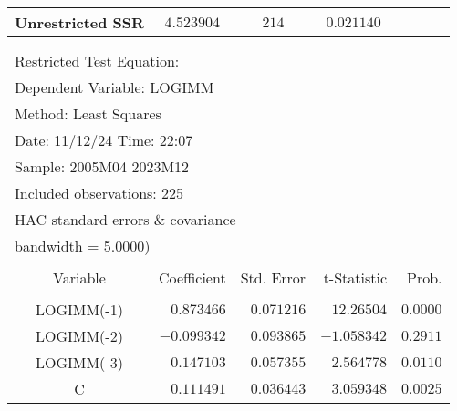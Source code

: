 \begin{tabular}{lrrrr}
\multicolumn{1}{l}{Unrestricted SSR}&\multicolumn{1}{c}{$4.523904$}&\multicolumn{1}{c}{$214$}&\multicolumn{1}{c}{$0.021140$}&\multicolumn{1}{c}{}\\
[4.5pt] \hline \\ [-4.5pt]
\multicolumn{1}{c}{}&\multicolumn{1}{c}{}&\multicolumn{1}{c}{}&\multicolumn{1}{c}{}&\multicolumn{1}{c}{}\\
\multicolumn{2}{l}{Restricted Test Equation:}&\multicolumn{1}{c}{}&\multicolumn{1}{c}{}&\multicolumn{1}{c}{}\\
\multicolumn{2}{l}{Dependent Variable: LOGIMM}&\multicolumn{1}{c}{}&\multicolumn{1}{c}{}&\multicolumn{1}{c}{}\\
\multicolumn{2}{l}{Method: Least Squares}&\multicolumn{1}{c}{}&\multicolumn{1}{c}{}&\multicolumn{1}{c}{}\\
\multicolumn{2}{l}{Date: 11/12/24   Time: 22:07}&\multicolumn{1}{c}{}&\multicolumn{1}{c}{}&\multicolumn{1}{c}{}\\
\multicolumn{2}{l}{Sample: 2005M04 2023M12}&\multicolumn{1}{c}{}&\multicolumn{1}{c}{}&\multicolumn{1}{c}{}\\
\multicolumn{2}{l}{Included observations: 225}&\multicolumn{1}{c}{}&\multicolumn{1}{c}{}&\multicolumn{1}{c}{}\\
\multicolumn{6}{l}{HAC standard errors \& covariance}\\
\multicolumn{2}{l}{bandwidth = 5.0000)}&\multicolumn{1}{c}{}&\multicolumn{1}{c}{}&\multicolumn{1}{c}{}\\
[4.5pt] \hline \\ [-4.5pt]
\multicolumn{1}{c}{Variable}&\multicolumn{1}{r}{Coefficient}&\multicolumn{1}{r}{Std. Error}&\multicolumn{1}{r}{t-Statistic}&\multicolumn{1}{r}{Prob.}\\
[4.5pt] \hline \\ [-4.5pt]
\multicolumn{1}{c}{LOGIMM(-1)}&\multicolumn{1}{r}{$0.873466$}&\multicolumn{1}{r}{$0.071216$}&\multicolumn{1}{r}{$12.26504$}&\multicolumn{1}{r}{$0.0000$}\\
\multicolumn{1}{c}{LOGIMM(-2)}&\multicolumn{1}{r}{$-0.099342$}&\multicolumn{1}{r}{$0.093865$}&\multicolumn{1}{r}{$-1.058342$}&\multicolumn{1}{r}{$0.2911$}\\
\multicolumn{1}{c}{LOGIMM(-3)}&\multicolumn{1}{r}{$0.147103$}&\multicolumn{1}{r}{$0.057355$}&\multicolumn{1}{r}{$2.564778$}&\multicolumn{1}{r}{$0.0110$}\\
\multicolumn{1}{c}{C}&\multicolumn{1}{r}{$0.111491$}&\multicolumn{1}{r}{$0.036443$}&\multicolumn{1}{r}{$3.059348$}&\multicolumn{1}{r}{$0.0025$}\\

\end{tabular}
